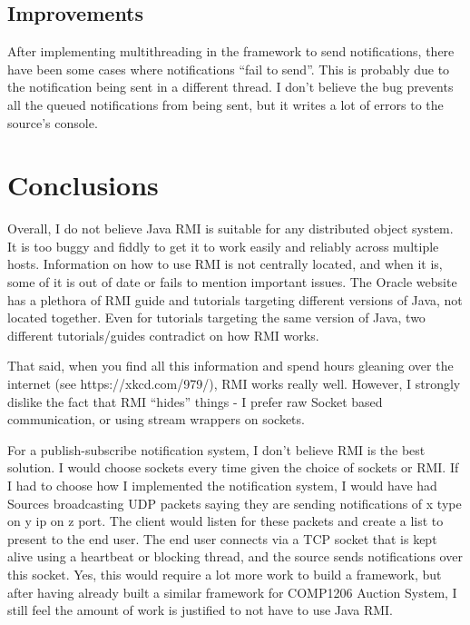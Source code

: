 \documentclass[a4paper]{article}
\begin{document}
\subsection{Improvements}
After implementing multithreading in the framework to send notifications, there have been some cases where notifications ``fail to send''.
This is probably due to the notification being sent in a different thread.
I don't believe the bug prevents all the queued notifications from being sent, but it writes a lot of errors to the source's console.

\section{Conclusions}
Overall, I do not believe Java RMI is suitable for any distributed object system.
It is too buggy and fiddly to get it to work easily and reliably across multiple hosts.
Information on how to use RMI is not centrally located, and when it is, some of it is out of date or fails to mention important issues.
The Oracle website has a plethora of RMI guide and tutorials targeting different versions of Java, not located together.
Even for tutorials targeting the same version of Java, two different tutorials/guides contradict on how RMI works.

That said, when you find all this information and spend hours gleaning over the internet (see https://xkcd.com/979/),
RMI works really well.
However, I strongly dislike the fact that RMI ``hides'' things - I prefer raw Socket based communication, or using stream wrappers on sockets.

For a publish-subscribe notification system, I don't believe RMI is the best solution.
I would choose sockets every time given the choice  of sockets or RMI.
If I had to choose how I implemented the notification system, I would have had Sources broadcasting UDP packets saying they are sending notifications of x type on y ip on z port.
The client would listen for these packets and create a list to present to the end user.
The end user connects via a TCP socket that is kept alive using a heartbeat or blocking thread, and the source sends notifications over this socket.
Yes, this would require a lot more work to build a framework, but after having already built a similar framework for COMP1206 Auction System,
I still feel the amount of work is justified to not have to use Java RMI.
\end{document}
